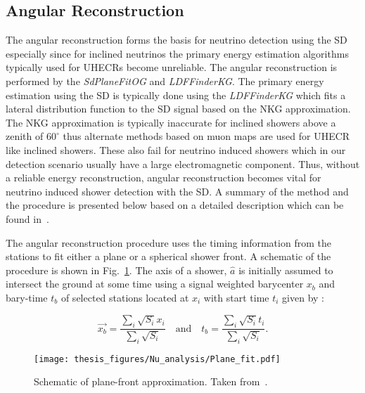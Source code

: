\subsection{Angular Reconstruction}
\label{subsec:angular_reco}

The angular reconstruction forms the basis for neutrino detection using the SD especially since for inclined neutrinos the primary energy estimation algorithms typically used for UHECRs become unreliable. The angular reconstruction is performed by the \textit{SdPlaneFitOG} and \textit{LDFFinderKG}. The primary energy estimation using the SD is typically done using the \textit{LDFFinderKG} which fits a lateral distribution function to the SD signal based on the NKG approximation. The NKG approximation is typically inaccurate for inclined showers above a zenith of $60^{\circ}$ thus alternate methods based on muon maps are used for UHECR like inclined showers. These also fail for neutrino induced showers which in our detection scenario usually have a large electromagnetic component. Thus, without a reliable energy reconstruction, angular reconstruction becomes vital for neutrino induced shower detection with the SD. A summary of the method and the procedure is presented below based on a detailed description which can be found in~\cite{PierreAuger:2020yab}. 

The angular reconstruction procedure uses the timing information from the stations to fit either a plane or a spherical shower front. A schematic of the procedure is shown in Fig.~\ref{fig:Plane_fit}. The axis of a shower, $\hat{a}$ is initially assumed to intersect the ground at some time using a signal weighted barycenter $x_b$ and bary-time $t_b$ of selected stations located at $x_i$ with start time $t_i$ given by :

\begin{equation}
  \vec{x_{b}} = \frac{\sum_{i} \sqrt{S_i} x_i}{\sum_{i} \sqrt{S_i}} \quad \text{and} \quad t_b = \frac{\sum_{i} \sqrt{S_i} t_i}{\sum_{i} \sqrt{S_i}}.
\end{equation}

\begin{figure}[t!]
  \centering
  \texttt{[image: thesis\_figures/Nu\_analysis/Plane\_fit.pdf]}
  \caption{Schematic of plane-front approximation. Taken from~\cite{PierreAuger:2020yab}.}
  \label{fig:Plane_fit}
  \end{figure}

